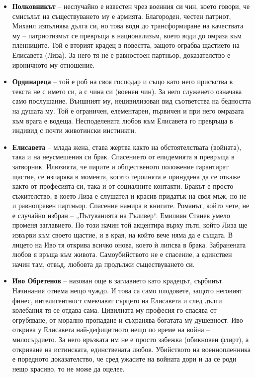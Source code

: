 \documentclass[12pt,a4paper]{article}
\begin{document}
\begin{itemize}[leftmargin=*, noitemsep, topsep=2pt, parsep=0pt]
    \item \textbf{Полковникът} – неслучайно е известен чрез военния си чин, което говори, че смисълът на съществуването му е армията. Благороден, честен патриот, Михаил изпълнява дълга си, но това води до трансформиране на качествата му – патриотизмът се превръща в национализъм, което води до омраза към пленниците. Той е вторият крадец в повестта, защото ограбва щастието на Елисавета (Лиза). За него тя не е равностоен партньор, доказателство е ироничното му отношение.
\vspace{0.1cm}
    \item \textbf{Ординареца} – той е роб на своя господар и също като него присъства в текста не с името си, а с чина си (военен чин). За него служенето означава само послушание. Външният му, нецивилизован вид съответства на бедността на душата му. Той е ограничен, елементарен, първичен и при него омразата към врага е водеща. Несподелената любов към Елисавета го превръща в индивид с почти животински инстинкти.
\vspace{0.1cm}
    \item \textbf{Елисавета} – млада жена, става жертва както на обстоятелствата (войната), така и на неусмешения си брак. Спасението от епидемията я превръща в затворник. Илюзията, че парите и общественото положение гарантират щастие, се изпарява в момента, когато героинята е принудена да се откаже както от професията си, така и от социалните контакти. Бракът е просто съжителство, в което Лиза е слушател и красив придатък на своя мъж, но не и равноправен партньор. Спасение намира в книгите. Романът, който чете, не е случайно избран – „Пътуванията на Гъливер“. Емилиян Станев умело променя заглавието. По този начин той акцентира върху пътя, който Лиза ще извърви към своето щастие, и в края, на който вече няма да е същата. В лицето на Иво тя открива всичко онова, което ѝ липсва в брака. Забранената любов я връща към живота. Самоубийството не е спасение, а единствен начин там, отвъд, любовта да продължи съществуването си.
\vspace{0.1cm}
    \item \textbf{Иво Обретенов} – назован още в заглавието като крадецът, сърбинът. Начинания отнема нещо чуждо. И това са само плодовете, защото неговият финес, интелигентност смекчават сърцето на Елисавета и след дълги колебания тя се отдава сама. Цивилната му професия го спасява от огрубяване, от морално пропадане и съхранява богатата му душевност. Иво открива у Елисавета най-дефицитното нещо по време на война – милосърдието. За него връзката им не е просто забежка (обикновен флирт), а откриване на истинската, единствената любов. Убийството на военнопленника е поредното доказателство, че сред ужасите на войната дори и да се роди нещо красиво, то не може да оцелее.
\end{itemize}
\end{document}
